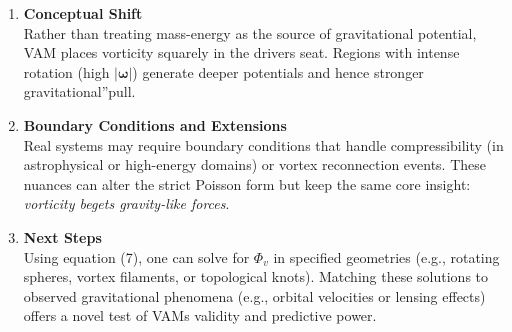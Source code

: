 \begin{enumerate}
    \item \textbf{Conceptual Shift} \\
    Rather than treating mass-energy as the source of gravitational potential, VAM places vorticity squarely in the driver\rqs s seat. Regions with intense rotation (high \(|\boldsymbol{\omega}|\)) generate deeper potentials and hence stronger \grqq gravitational\textquotedblright pull.
    \item \textbf{Boundary Conditions and Extensions} \\
    Real systems may require boundary conditions that handle compressibility (in astrophysical or high-energy domains) or vortex reconnection events. These nuances can alter the strict Poisson form but keep the same core insight: \textit{vorticity begets gravity-like forces}.
    \item \textbf{Next Steps} \\
    Using equation (7), one can solve for \(\Phi_v\) in specified geometries (e.g., rotating spheres, vortex filaments, or topological knots). Matching these solutions to observed gravitational phenomena (e.g., orbital velocities or lensing effects) offers a novel test of VAM\rqs s validity and predictive power.
\end{enumerate}